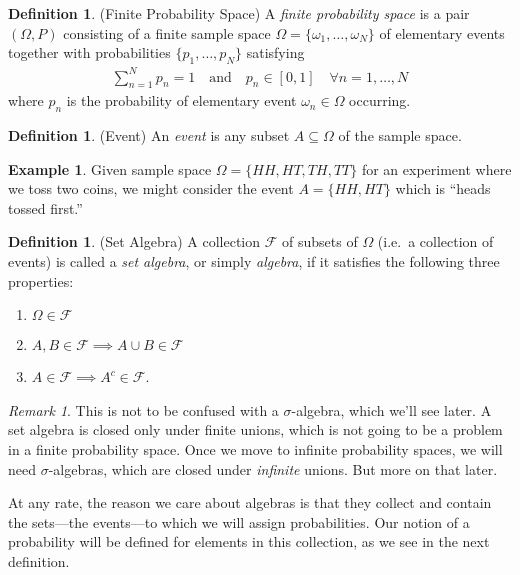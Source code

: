 \documentclass[12pt]{article}
\theoremstyle{plain}
\theoremstyle{definition}
\newtheorem{defn}[thm]{Definition}
\newtheorem{ex}[thm]{Example}
\theoremstyle{remark}
\newtheorem*{rmk}{Remark}
\newcommand{\calF}{\mathcal{F}}
\newcommand{\sumnN}{\sum^N_{n=1}}
\begin{document}
\begin{defn}{(Finite Probability Space)}
A \emph{finite probability space} is a pair $(\Omega,P)$ consisting of a
finite sample space $\Omega=\{\omega_1,\ldots,\omega_N\}$ of elementary
events together with probabilities $\{p_1,\ldots,p_N\}$ satisfying
\begin{align*}
  \sumnN p_n = 1
  \quad\text{and}\quad
  p_n \in [0,1] \quad \forall n=1,\ldots,N
\end{align*}
where $p_n$ is the probability of elementary event $\omega_n\in\Omega$
occurring.
\end{defn}

\begin{defn}{(Event)}
An \emph{event} is any subset $A\subseteq \Omega$ of the sample space.
\end{defn}
\begin{ex}
Given sample space $\Omega=\{HH,HT,TH,TT\}$ for an experiment where we
toss two coins, we might consider the event $A=\{HH,HT\}$ which is
``heads tossed first.''
\end{ex}


\begin{defn}{(Set Algebra)}
A collection $\calF$ of subsets of $\Omega$ (i.e.\ a collection of
events) is called a \emph{set algebra}, or simply \emph{algebra}, if it
satisfies the following three properties:
\begin{enumerate}
  \item $\Omega\in\calF$
  \item $A,B\in\calF \implies A\cup B\in\calF$
  \item $A\in\calF\implies A^c\in\calF$.
\end{enumerate}
\end{defn}
\begin{rmk}
This is not to be confused with a $\sigma$-algebra, which we'll see
later. A set algebra is closed only under finite unions, which is not
going to be a problem in a finite probability space. Once we move to
infinite probability spaces, we will need $\sigma$-algebras, which are
closed under \emph{infinite} unions. But more on that later.

At any rate, the reason we care about algebras is that they collect and
contain the sets---the events---to which we will assign probabilities.
Our notion of a probability will be defined for elements in this
collection, as we see in the next definition.
\end{rmk}
\end{document}
